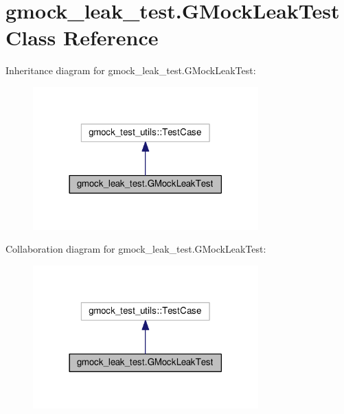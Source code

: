 \hypertarget{classgmock__leak__test_1_1GMockLeakTest}{}\section{gmock\+\_\+leak\+\_\+test.\+G\+Mock\+Leak\+Test Class Reference}
\label{classgmock__leak__test_1_1GMockLeakTest}


Inheritance diagram for gmock\+\_\+leak\+\_\+test.\+G\+Mock\+Leak\+Test\+:\nopagebreak
\begin{figure}[H]
\begin{center}
\leavevmode
\includegraphics[width=246pt]{classgmock__leak__test_1_1GMockLeakTest__inherit__graph}
\end{center}
\end{figure}


Collaboration diagram for gmock\+\_\+leak\+\_\+test.\+G\+Mock\+Leak\+Test\+:\nopagebreak
\begin{figure}[H]
\begin{center}
\leavevmode
\includegraphics[width=246pt]{classgmock__leak__test_1_1GMockLeakTest__coll__graph}
\end{center}
\end{figure}
